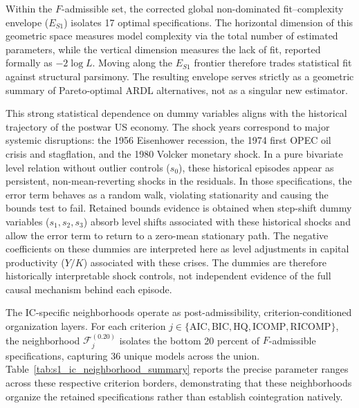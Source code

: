\documentclass[11pt]{article}
\begin{document}
Within the \(F\)-admissible set, the corrected global non-dominated fit--complexity envelope (\(E_{S1}\)) isolates 17 optimal specifications. The horizontal dimension of this geometric space measures model complexity via the total number of estimated parameters, while the vertical dimension measures the lack of fit, reported formally as \(-2\log L\). Moving along the \(E_{S1}\) frontier therefore trades statistical fit against structural parsimony. The resulting envelope serves strictly as a geometric summary of Pareto-optimal ARDL alternatives, not as a singular new estimator.

This strong statistical dependence on dummy variables aligns with the historical trajectory of the postwar US economy. The shock years correspond to major systemic disruptions: the 1956 Eisenhower recession, the 1974 first OPEC oil crisis and stagflation, and the 1980 Volcker monetary shock. In a pure bivariate level relation without outlier controls ($s_0$), these historical episodes appear as persistent, non-mean-reverting shocks in the residuals. In those specifications, the error term behaves as a random walk, violating stationarity and causing the bounds test to fail. Retained bounds evidence is obtained when step-shift dummy variables ($s_1, s_2, s_3$) absorb level shifts associated with these historical shocks and allow the error term to return to a zero-mean stationary path. The negative coefficients on these dummies are interpreted here as level adjustments in capital productivity ($Y/K$) associated with these crises. The dummies are therefore historically interpretable shock controls, not independent evidence of the full causal mechanism behind each episode.

The IC-specific neighborhoods operate as post-admissibility, criterion-conditioned organization layers. For each criterion \(j \in \{\mathrm{AIC},\mathrm{BIC},\mathrm{HQ},\mathrm{ICOMP},\mathrm{RICOMP}\}\), the neighborhood \(\mathcal{F}^{(0.20)}_j\) isolates the bottom 20 percent of \(F\)-admissible specifications, capturing 36 unique models across the union. Table~\ref{tab:s1_ic_neighborhood_summary} reports the precise parameter ranges across these respective criterion borders, demonstrating that these neighborhoods organize the retained specifications rather than establish cointegration natively. 
\end{document}
